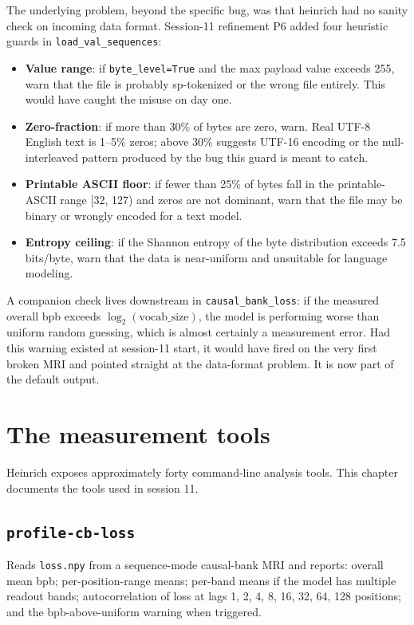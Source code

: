 \documentclass[11pt,openany]{book}
\begin{document}
The underlying problem, beyond the specific bug, was that heinrich
had no sanity check on incoming data format. Session-11 refinement P6
added four heuristic guards in \texttt{load\_val\_sequences}:

\begin{itemize}
  \item \textbf{Value range}: if \texttt{byte\_level=True} and the
  max payload value exceeds 255, warn that the file is probably
  sp-tokenized or the wrong file entirely. This would have caught the
  misuse on day one.
  \item \textbf{Zero-fraction}: if more than 30\% of bytes are zero,
  warn. Real UTF-8 English text is 1--5\% zeros; above 30\% suggests
  UTF-16 encoding or the null-interleaved pattern produced by the bug
  this guard is meant to catch.
  \item \textbf{Printable ASCII floor}: if fewer than 25\% of bytes
  fall in the printable-ASCII range [32, 127) and zeros are not
  dominant, warn that the file may be binary or wrongly encoded for
  a text model.
  \item \textbf{Entropy ceiling}: if the Shannon entropy of the byte
  distribution exceeds 7.5 bits/byte, warn that the data is
  near-uniform and unsuitable for language modeling.
\end{itemize}

A companion check lives downstream in \texttt{causal\_bank\_loss}: if
the measured overall bpb exceeds $\log_2(\mathrm{vocab\_size})$, the
model is performing worse than uniform random guessing, which is
almost certainly a measurement error. Had this warning existed at
session-11 start, it would have fired on the very first broken MRI
and pointed straight at the data-format problem. It is now part of
the default output.

\chapter{The measurement tools}
\label{chap:tools}

Heinrich exposes approximately forty command-line analysis tools.
This chapter documents the tools used in session 11.

\section{\texttt{profile-cb-loss}}

Reads \texttt{loss.npy} from a sequence-mode causal-bank MRI and
reports: overall mean bpb; per-position-range means;
per-band means if the model has multiple readout bands; autocorrelation
of loss at lags 1, 2, 4, 8, 16, 32, 64, 128 positions; and the
bpb-above-uniform warning when triggered.
\end{document}
